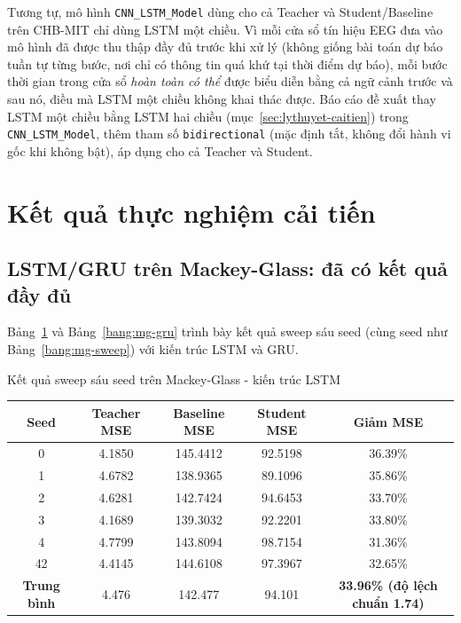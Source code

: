Tương tự, mô hình \texttt{CNN\_LSTM\_Model} dùng cho cả Teacher và Student/Baseline trên
CHB-MIT chỉ dùng LSTM một chiều. Vì mỗi cửa sổ tín hiệu EEG đưa vào mô hình đã được thu thập
đầy đủ trước khi xử lý (không giống bài toán dự báo tuần tự từng bước, nơi chỉ có thông tin quá
khứ tại thời điểm dự báo), mỗi bước thời gian trong cửa sổ \textit{hoàn toàn có thể} được biểu
diễn bằng cả ngữ cảnh trước và sau nó, điều mà LSTM một chiều không khai thác được. Báo cáo đề
xuất thay LSTM một chiều bằng LSTM hai chiều (mục~\ref{sec:lythuyet-caitien}) trong
\texttt{CNN\_LSTM\_Model},
thêm tham số \texttt{bidirectional} (mặc định tắt, không đổi hành vi gốc khi không bật), áp dụng
cho cả Teacher và Student.

\section{Kết quả thực nghiệm cải tiến}

\subsection{LSTM/GRU trên Mackey-Glass: đã có kết quả đầy đủ}

Bảng~\ref{bang:mg-lstm} và Bảng~\ref{bang:mg-gru} trình bày kết quả sweep sáu seed (cùng seed
như Bảng~\ref{bang:mg-sweep}) với kiến trúc LSTM và GRU.

\begin{table}[H]{Kết quả sweep sáu seed trên Mackey-Glass - kiến trúc LSTM}
	\label{bang:mg-lstm}
	\centering
	\begin{tabular}{cccc c}
		\toprule
		\textbf{Seed} & \textbf{Teacher MSE} & \textbf{Baseline MSE} & \textbf{Student MSE} & \textbf{Giảm MSE} \\
		\midrule
		0  & 4.1850 & 145.4412 & 92.5198 & 36.39\% \\
		1  & 4.6782 & 138.9365 & 89.1096 & 35.86\% \\
		2  & 4.6281 & 142.7424 & 94.6453 & 33.70\% \\
		3  & 4.1689 & 139.3032 & 92.2201 & 33.80\% \\
		4  & 4.7799 & 143.8094 & 98.7154 & 31.36\% \\
		42 & 4.4145 & 144.6108 & 97.3967 & 32.65\% \\
		\midrule
		\textbf{Trung bình} & 4.476 & 142.477 & 94.101 & \textbf{33.96\% (độ lệch chuẩn 1.74)} \\
		\bottomrule
	\end{tabular}
\end{table}

